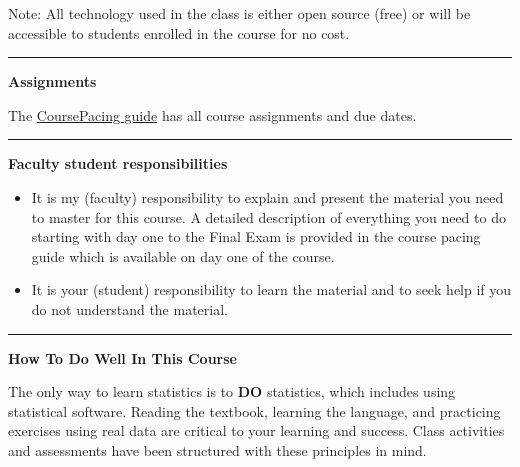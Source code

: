 \documentclass[
]{article}
\begin{document}
Note: All technology used in the class is either open source (free) or
will be accessible to students enrolled in the course for no cost.

\begin{center}\rule{0.5\linewidth}{0.5pt}\end{center}

\textbf{Assignments}

The \href{../CoursePacing/CoursePacingF2023.html}{CoursePacing guide}
has all course assignments and due dates.

\begin{center}\rule{0.5\linewidth}{0.5pt}\end{center}

\begin{rmdnote}
\textbf{Faculty student responsibilities}

\begin{itemize}
\item
  It is my (faculty) responsibility to explain and present the material
  you need to master for this course. A detailed description of
  everything you need to do starting with day one to the Final Exam is
  provided in the course pacing guide which is available on day one of
  the course.
\item
  It is your (student) responsibility to learn the material and to seek
  help if you do not understand the material.
\end{itemize}
\end{rmdnote}

\begin{center}\rule{0.5\linewidth}{0.5pt}\end{center}

\textbf{How To Do Well In This Course}

The only way to learn statistics is to \textbf{DO} statistics, which
includes using statistical software. Reading the textbook, learning the
language, and practicing exercises using real data are critical to your
learning and success. Class activities and assessments have been
structured with these principles in mind.
\end{document}
